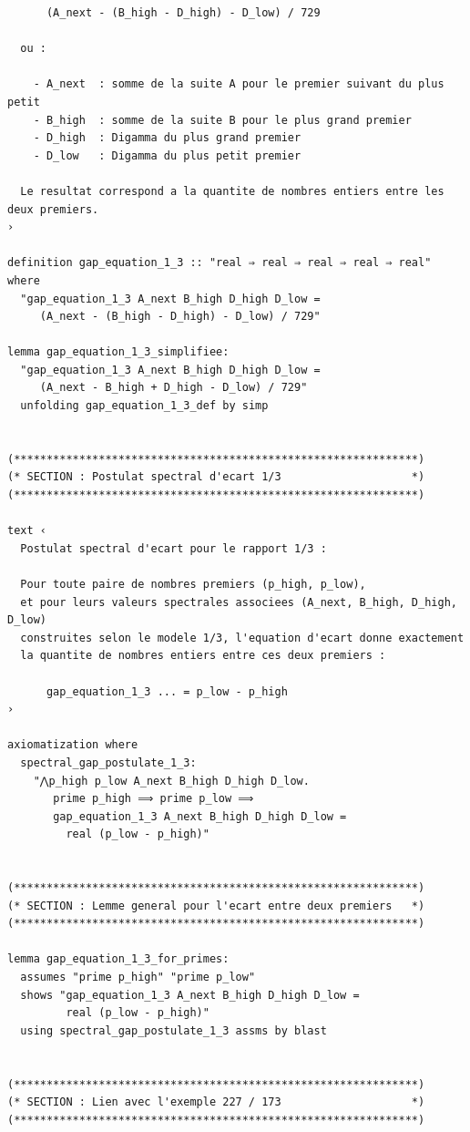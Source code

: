 \documentclass[a4paper,11pt]{article}
\begin{document}
\begin{holcode}[title={\textcolor{white}{Fichier : methode\_spectral.thy -- Partie 1/4}}]
\begin{lstlisting}
      (A_next - (B_high - D_high) - D_low) / 729

  ou :

    - A_next  : somme de la suite A pour le premier suivant du plus petit
    - B_high  : somme de la suite B pour le plus grand premier
    - D_high  : Digamma du plus grand premier
    - D_low   : Digamma du plus petit premier

  Le resultat correspond a la quantite de nombres entiers entre les deux premiers.
›

definition gap_equation_1_3 :: "real ⇒ real ⇒ real ⇒ real ⇒ real" where
  "gap_equation_1_3 A_next B_high D_high D_low =
     (A_next - (B_high - D_high) - D_low) / 729"

lemma gap_equation_1_3_simplifiee:
  "gap_equation_1_3 A_next B_high D_high D_low =
     (A_next - B_high + D_high - D_low) / 729"
  unfolding gap_equation_1_3_def by simp


(**************************************************************)
(* SECTION : Postulat spectral d'ecart 1/3                    *)
(**************************************************************)

text ‹
  Postulat spectral d'ecart pour le rapport 1/3 :

  Pour toute paire de nombres premiers (p_high, p_low),
  et pour leurs valeurs spectrales associees (A_next, B_high, D_high, D_low)
  construites selon le modele 1/3, l'equation d'ecart donne exactement
  la quantite de nombres entiers entre ces deux premiers :

      gap_equation_1_3 ... = p_low - p_high
›

axiomatization where
  spectral_gap_postulate_1_3:
    "⋀p_high p_low A_next B_high D_high D_low.
       prime p_high ⟹ prime p_low ⟹
       gap_equation_1_3 A_next B_high D_high D_low =
         real (p_low - p_high)"


(**************************************************************)
(* SECTION : Lemme general pour l'ecart entre deux premiers   *)
(**************************************************************)

lemma gap_equation_1_3_for_primes:
  assumes "prime p_high" "prime p_low"
  shows "gap_equation_1_3 A_next B_high D_high D_low =
         real (p_low - p_high)"
  using spectral_gap_postulate_1_3 assms by blast


(**************************************************************)
(* SECTION : Lien avec l'exemple 227 / 173                    *)
(**************************************************************)


\end{lstlisting}
\end{holcode}
\end{document}
